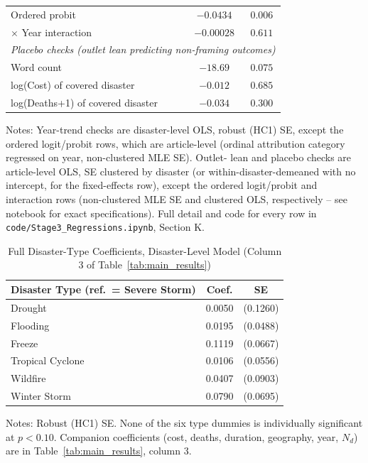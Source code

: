 \documentclass[12pt]{article}
\begin{document}
\begin{table}[ht]
\begin{threeparttable}
\begin{tabular}{lcc}
\quad Ordered probit                        & $-0.0434$   & $0.006$ \\
\quad $\times$ Year interaction             & $-0.00028$  & $0.611$ \\
\midrule
\multicolumn{3}{l}{\emph{Placebo checks (outlet lean predicting non-framing outcomes)}} \\
\quad Word count                            & $-18.69$    & $0.075$ \\
\quad log(Cost) of covered disaster          & $-0.012$    & $0.685$ \\
\quad log(Deaths+1) of covered disaster      & $-0.034$    & $0.300$ \\
\bottomrule
\end{tabular}
\begin{tablenotes}
\small
\item Notes: Year-trend checks are disaster-level OLS, robust (HC1) SE,
except the ordered logit/probit rows, which are article-level (ordinal
attribution category regressed on year, non-clustered MLE SE). Outlet-
lean and placebo checks are article-level OLS, SE clustered by disaster
(or within-disaster-demeaned with no intercept, for the fixed-effects
row), except the ordered logit/probit and interaction rows (non-clustered
MLE SE and clustered OLS, respectively -- see notebook for exact
specifications). Full detail and code for every row in
\texttt{code/Stage3\_Regressions.ipynb}, Section K.
\end{tablenotes}
\end{threeparttable}
\end{table}

\begin{table}[ht]
\centering
\caption{Full Disaster-Type Coefficients, Disaster-Level Model (Column 3 of Table~\ref{tab:main_results})}
\label{tab:appendix_type_full}
\begin{threeparttable}
\begin{tabular}{lcc}
\toprule
Disaster Type (ref.\ = Severe Storm) & Coef. & SE \\
\midrule
Drought          & 0.0050  & (0.1260) \\
Flooding         & 0.0195  & (0.0488) \\
Freeze           & 0.1119  & (0.0667) \\
Tropical Cyclone & 0.0106  & (0.0556) \\
Wildfire         & 0.0407  & (0.0903) \\
Winter Storm     & 0.0790  & (0.0695) \\
\bottomrule
\end{tabular}
\begin{tablenotes}
\small
\item Notes: Robust (HC1) SE. None of the six type dummies is individually
significant at $p<0.10$. Companion coefficients (cost, deaths, duration,
geography, year, $N_d$) are in Table~\ref{tab:main_results}, column 3.
\end{tablenotes}
\end{threeparttable}
\end{table}
\end{document}
